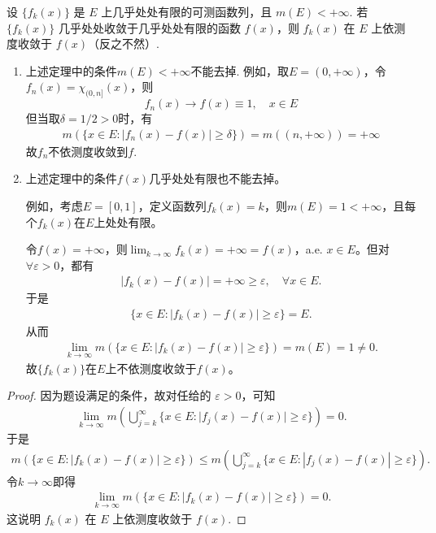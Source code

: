 \documentclass[../../main.tex]{subfiles}
\begin{document}
\begin{theorem}[Lebesgue定理]\label{theorem:几乎处处收敛在E的测度有限前提下必依测度收敛}
设 $\{f_k(x)\}$ 是 $E$ 上几乎处处有限的可测函数列，且 $m(E)<+\infty$. 若 $\{f_k(x)\}$ 几乎处处收敛于几乎处处有限的函数 $f(x)$，则 $f_k(x)$ 在 $E$ 上依测度收敛于 $f(x)$（反之不然）.
\end{theorem}
\begin{remark}
\begin{enumerate}
\item 上述定理中的条件\(m(E) < +\infty\)不能去掉. 例如，取\(E = (0, +\infty)\)，令\(f_n(x) = \chi_{(0,n]}(x)\)，则
\[f_n(x) \to f(x) \equiv 1, \quad x \in E\]
但当取\(\delta = 1/2 > 0\)时，有
\begin{align*}
m(\{x \in E : |f_n(x) - f(x)| \geqslant \delta\}) = m((n, +\infty)) = +\infty
\end{align*}
故\(f_n\)不依测度收敛到\(f\). 

\item 上述定理中的条件\(f(x)\)几乎处处有限也不能去掉。

例如，考虑\(E = [0, 1]\)，定义函数列\(f_k(x) = k\)，则\(m(E) = 1 < +\infty\)，且每个\(f_k(x)\)在\(E\)上处处有限。

令\(f(x) = +\infty\)，则\(\lim_{k \to \infty} f_k(x) = +\infty = f(x)\)，a.e. \(x \in E\)。但对\(\forall \varepsilon > 0\)，都有
\begin{align*}
|f_k(x) - f(x)| = +\infty \geqslant \varepsilon, \quad \forall x \in E.
\end{align*}
于是
\begin{align*}
\{x \in E : |f_k(x) - f(x)| \geqslant \varepsilon\} = E.
\end{align*}
从而
\begin{align*}
\lim_{k \to \infty} m(\{x \in E : |f_k(x) - f(x)| \geqslant \varepsilon\}) = m(E) = 1 \ne 0.
\end{align*}
故\(\{f_k(x)\}\)在\(E\)上不依测度收敛于\(f(x)\)。
\end{enumerate}
\end{remark}
\begin{proof}
因为题设满足的条件，故对任给的 $\varepsilon>0$，可知
\begin{align*}
\lim_{k\to\infty}m\left(\bigcup_{j = k}^{\infty}\{x\in E:\vert f_j(x)-f(x)\vert\geqslant\varepsilon\}\right)=0.
\end{align*}
于是
\begin{align*}
m(\{x\in E:\left| f_k(x)-f(x) \right|\geqslant \varepsilon \})\leqslant m\left( \bigcup_{j=k}^{\infty}{\{x}\in E:\left| f_j(x)-f(x) \right|\geqslant \varepsilon \} \right) .
\end{align*}
令$k\to \infty$即得
\begin{align*}
\lim_{k\to\infty}m(\{x\in E:\vert f_k(x)-f(x)\vert\geqslant\varepsilon\}) = 0.
\end{align*}
这说明 $f_k(x)$ 在 $E$ 上依测度收敛于 $f(x)$.
\end{proof}
\end{document}
